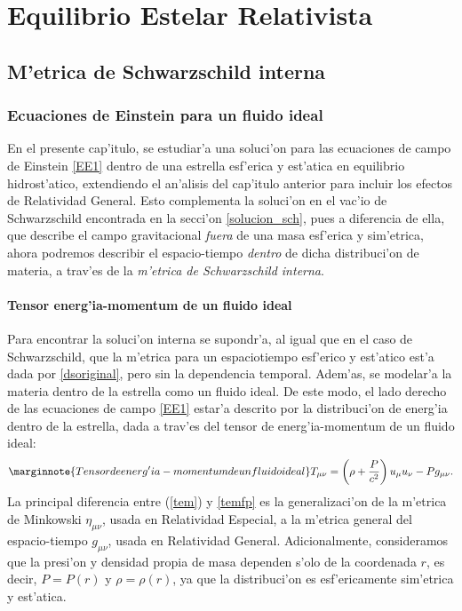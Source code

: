 \chapter{Equilibrio Estelar Relativista}\label{cap:Eq-Rel}

\section{M'etrica de Schwarzschild interna}

\subsection{Ecuaciones de Einstein para un fluido ideal}\label{sec:einsteinfluido}
En el presente cap'itulo, se estudiar'a una soluci'on para las ecuaciones de campo de Einstein \eqref{EE1} dentro de una estrella esf'erica y est'atica en equilibrio hidrost'atico, extendiendo el an'alisis del cap'itulo anterior para incluir los efectos de Relatividad General. Esto complementa la soluci'on en el vac'io de Schwarzschild encontrada en la secci'on \eqref{solucion_sch}, pues a diferencia de ella, que describe el campo gravitacional \emph{fuera} de una masa esf'erica y sim'etrica, ahora podremos describir el espacio-tiempo \emph{dentro} de dicha distribuci'on de materia, a trav'es de la \emph{m'etrica de Schwarzschild interna}.

\subsubsection{Tensor energ'ia-momentum de un fluido ideal}
Para encontrar la soluci'on interna se supondr'a, al igual que en el caso de Schwarzschild, que la m'etrica para un espaciotiempo esf'erico y est'atico est'a dada por \eqref{dsoriginal}, pero sin la dependencia temporal. Adem'as, se modelar'a la materia dentro de la estrella como un fluido ideal. De este modo, el lado derecho de las ecuaciones de campo \eqref{EE1} estar'a descrito por la distribuci'on de energ'ia dentro de la estrella, dada a trav'es del tensor de energ'ia-momentum de un fluido ideal:
\begin{equation}\label{tem}\marginnote{Tensor de energ'ia-momentum de un fluido ideal}
T_{\mu\nu}=\left(\rho+\dfrac{P}{c^2}\right)u_{\mu}u_{\nu}-Pg_{\mu\nu}.
\end{equation}
 La principal diferencia entre (\ref{tem}) y \eqref{temfp} es la generalizaci'on de la m'etrica de Minkowski $\eta_{\mu\nu}$, usada en Relatividad Especial, a la m'etrica general del espacio-tiempo $g_{\mu\nu}$, usada en Relatividad General. Adicionalmente, consideramos que la presi'on y densidad propia de masa dependen s'olo de la coordenada $r$, es decir, $P=P(r)$ y $\rho=\rho(r)$, ya que
la distribuci'on es esf'ericamente sim'etrica y est'atica.

